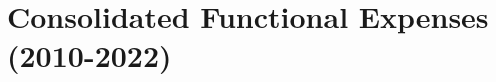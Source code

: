 
\chapter{Consolidated Functional Expenses (2010-2022)}%
\label{ch:consolidated_functional_expenses_2010-2022}

